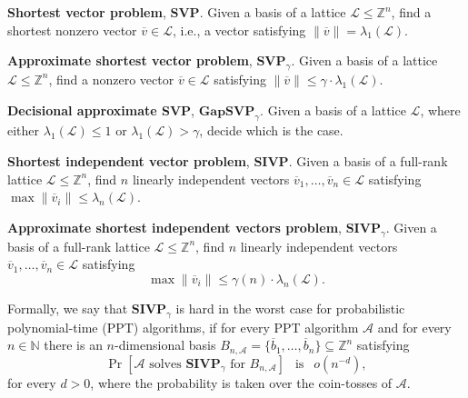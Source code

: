 \documentclass{jgcc}
\def\ovb{{\overline{b}}}
\def\ovt{{\overline{t}}}
\def\ovv{{\overline{v}}}
\def\CA{{\mathcal A}}
\def\CL{{\mathcal L}}
\def\SIVP{{\mathbf{SIVP}}}
\def\BDD{{\mathbf{BDD}}}
\def\CVP{{\mathbf{CVP}}}
\def\SVP{{\mathbf{SVP}}}
\def\GAPSVP{{\mathbf{GapSVP}}}
\def\MN{{\mathbb{N}}}
\def\MZ{{\mathbb{Z}}}
\def\MR{{\mathbb{R}}}
\begin{document}
\medskip\noindent
\textbf{Shortest vector problem}, $\SVP$.
Given a basis of a lattice $\CL\le \MZ^n$,
find a shortest nonzero vector $\ovv \in \CL$, i.e., 
a vector satisfying $\|\ovv\| = \lambda_1(\CL)$.

\medskip\noindent
\textbf{Approximate shortest vector problem}, $\SVP_\gamma$.
Given a basis of a lattice $\CL\le \MZ^n$,
find a nonzero vector $\ovv \in \CL$ satisfying
$\|\ovv\|\le \gamma\cdot \lambda_1(\CL)$.


\medskip\noindent
\textbf{Decisional approximate SVP}, $\GAPSVP_\gamma$.
Given a basis of a lattice $\CL$,
where either $\lambda_1(\CL)\le 1$ or $\lambda_1(\CL)>\gamma$,
decide which is the case.


\medskip\noindent
\textbf{Shortest independent vector problem}, $\SIVP$.
Given a basis of a full-rank lattice $\CL\le \MZ^n$,
find $n$ linearly independent vectors $\ovv_1,\dots,\ovv_n\in \CL$
satisfying $\max \|\ovv_i\| \le \lambda_n(\CL)$.

\medskip\noindent
\textbf{Approximate shortest independent vectors problem}, $\SIVP_\gamma$.
Given a basis of a full-rank lattice $\CL\le \MZ^n$,
find $n$ linearly independent vectors $\ovv_1,\dots,\ovv_n\in \CL$
satisfying
$$
\max \|\ovv_i\| \le \gamma(n) \cdot \lambda_n(\CL).
$$

\medskip
Formally, we say that $\SIVP_{\gamma}$ is hard in the worst case
for probabilistic polynomial-time (PPT) algorithms,
if for every PPT algorithm $\CA$
and for every $n\in\MN$ there is an $n$-dimensional basis
$B_{n,\CA}=\{\ovb_1,\dots,\ovb_n\}\subseteq \MZ^n$  satisfying
\begin{equation}\label{eq:SIVP-hardness}
\Pr[\CA \mbox{ solves } \SIVP_{\gamma} \mbox{ for } B_{n,\CA}] 
\ \ \mbox{ is }\ \  o(n^{-d}),
\end{equation}
for every $d>0$, where the probability is taken over the coin-tosses of $\CA$.


% 
\end{document}

